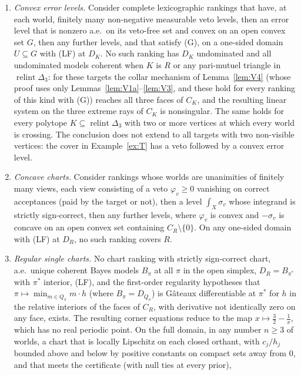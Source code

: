 \documentclass[11pt]{article}
\DeclareMathOperator{\relint}{relint}
\theoremstyle{plain}
\theoremstyle{definition}
\theoremstyle{remark}
\begin{document}
\begin{enumerate}[label=(\arabic*)]
  \item \emph{Convex error levels.} Consider complete lexicographic rankings that have, at
  each world, finitely many non-negative measurable veto levels, then an error level that
  is nonzero a.e.\ on its veto-free set and convex on an open convex set $G$, then any
  further levels, and that satisfy (G), on a one-sided domain $U\subseteq G$ with (LF) at
  $D_K$. No such ranking has $D_K$ undominated and all undominated models coherent when $K$
  is $R$ or any pari-mutuel triangle in $\relint\Delta_3$: for these targets the collar
  mechanism of Lemma~\ref{lem:V4} (whose proof uses only Lemmas~\ref{lem:V1a}--\ref{lem:V3},
  and these hold for every ranking of this kind with (G)) reaches all three faces of
  $C_K$, and the resulting linear system on
  the three extreme rays of $C_K$ is nonsingular. The same holds for every polytope
  $K\subseteq\relint\Delta_3$ with two or more vertices at which every world is crossing.
  The conclusion does not extend to all targets with two non-visible vertices: the cover
  in Example~\ref{ex:T} has a veto followed by a convex error level.
  \item \emph{Concave charts.} Consider rankings whose worlds are unanimities of finitely
  many views, each view consisting of a veto $\varphi_v\ge0$ vanishing on correct
  acceptances (paid by the target or not), then a level $\int_X\sigma_v$ whose integrand is
  strictly sign-correct, then any further levels, where $\varphi_v$ is convex and
  $-\sigma_v$ is concave on an open convex set containing $C_R\setminus\{0\}$. On any
  one-sided domain with (LF) at $D_R$, no such ranking covers $R$.
  \item \emph{Regular single charts.} No chart ranking with strictly sign-correct chart,
  a.e.\ unique coherent Bayes models $B_\pi$ at all $\pi$ in the open simplex, $D_R=
  B_{\pi^\ast}$ with $\pi^\ast$ interior, (LF), and the first-order regularity hypotheses
  that $\pi\mapsto\min_{m\in Q_\pi}m\cdot h$ (where $B_\pi=D_{Q_\pi}$) is Gâteaux
  differentiable at $\pi^\ast$ for $h$ in the relative interiors of the faces of $C_R$,
  with derivative not identically zero on any face, exists. The resulting corner equations
  reduce to the map $x\mapsto\frac32-\frac1x$, which has no real periodic point. On the
  full domain, in any number $n\ge3$ of worlds, a chart that is locally Lipschitz on each
  closed orthant, with $c_j/h_j$ bounded above and below by positive constants on compact
  sets away from $0$, and that meets the certificate (with null ties at every prior),

\end{enumerate}
\end{document}
